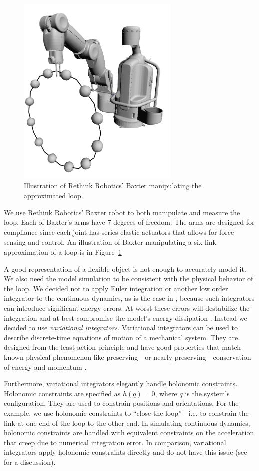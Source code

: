 \documentclass[letterpaper, 10pt, conference]{ieeeconf}
\begin{document}
\begin{figure}
\centering
\includegraphics[width = 220pt]{init_bloop.pdf}
\caption{Illustration of Rethink Robotics' Baxter manipulating the approximated loop.}
\label{fig-baxter_image_1}
\end{figure}

We use Rethink Robotics' Baxter \cite{guizzo2011rethink} robot to both manipulate and measure the loop.  Each of Baxter's arms have 7 degrees of freedom.  The arms are designed for compliance since each joint has series elastic actuators that allows for force sensing and control.  An illustration of Baxter manipulating a six link approximation of a loop is in Figure~\ref{fig-baxter_image_1}

A good representation of a flexible object is not enough to accurately model it.  We also need the model simulation to be consistent with the physical behavior of the loop.  We decided not to apply Euler integration or another low order integrator to the continuous dynamics, as is the case in \cite{sahari_etal}, because such integrators can introduce significant energy errors.  At worst these errors will destabilize the integration and at best compromise the model's energy dissipation \cite{johnson_murphey_scalable}.  Instead we decided to use \emph{variational integrators}.  Variational integrators can be used to describe discrete-time equations of motion of a mechanical system.  They are designed from the least action principle and have good properties that match known physical phenomenon like preserving---or nearly preserving---conservation of energy and momentum \cite{johnson_murphey_scalable, marsden_west}.

Furthermore, variational integrators elegantly handle holonomic constraints.  Holonomic constraints are specified as $h(q) = 0$, where $q$ is the system's configuration.  They are used to constrain positions and orientations.  For the example, we use holonomic constraints to ``close the loop''---i.e. to constrain the link at one end of the loop to the other end.  In simulating continuous dynamics, holonomic constraints are handled with equivalent constraints on the acceleration that creep due to numerical integration error.  In comparison, variational integrators apply holonomic constraints directly and do not have this issue (see \cite{johnson_murphey_scalable} for a discussion).
\end{document}
